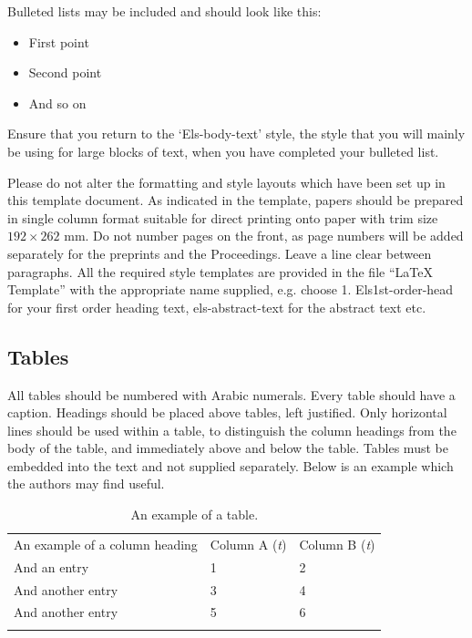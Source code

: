 \documentclass[5p,times,procedia]{elsarticle}
\begin{document}
Bulleted lists may be included and should look like this:
\begin{itemize}[]
\item First point
\item Second point
\item And so on
\end{itemize}

Ensure that you return to the `Els-body-text' style, the style that you will mainly be using for large blocks of text, when you have completed your bulleted list. 

Please do not alter the formatting and style layouts which have been set up in this template document. As indicated in the template, papers should be prepared in single column format suitable for direct printing onto paper with trim size $192 \times 262$ mm. Do not number pages on the front, as page numbers will be added separately for the preprints and the Proceedings. Leave a line clear between paragraphs. All the required style templates are provided in the file ``LaTeX Template'' with the appropriate name supplied, e.g. choose 1. Els1st-order-head for your first order heading text, els-abstract-text for the abstract text etc.

\subsection{ Tables}

All tables should be numbered with Arabic numerals. Every table should have a caption. Headings should be placed above tables, left justified. Only horizontal lines should be used within a table, to distinguish the column headings from the body of the table, and immediately above and below the table. Tables must be embedded into the text and not supplied separately. Below is an example which the authors may find useful.

\begin{table}[h]
\caption{An example of a table.}
\begin{tabular*}{\hsize}{@{\extracolsep{\fill}}lll@{}}
\toprule
An example of a column heading & Column A ({\it{t}}) & Column B ({\it{t}})\\
\colrule
And an entry &   1 &  2\\
And another entry  & 3 &  4\\
And another entry &  5 &  6\\
\botrule
\end{tabular*}
\end{table}
\end{document}
